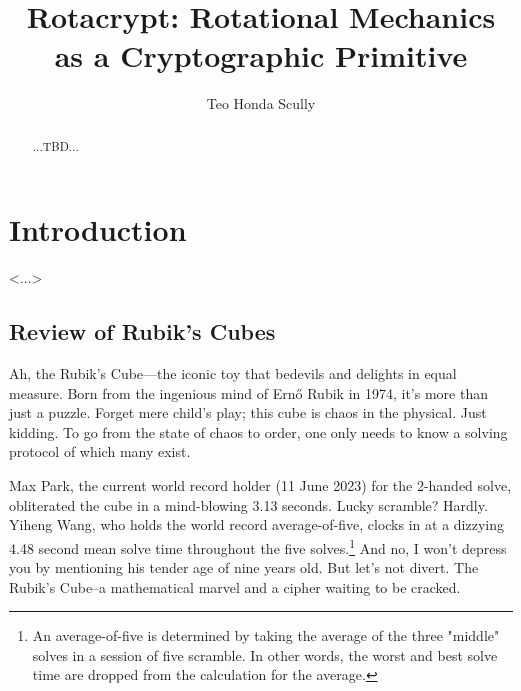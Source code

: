 \documentclass[12pt]{article}
\title{Rotacrypt: Rotational Mechanics as a Cryptographic Primitive}
\author{Teo Honda Scully}
\date{}
\begin{document}
\maketitle

\begin{abstract}
...TBD...
\end{abstract}

\tableofcontents

\newpage

\section{Introduction}
<...>

\subsection{Review of Rubik's Cubes}
Ah, the Rubik's Cube—the iconic toy that bedevils and delights in equal measure. Born from the ingenious mind of Ernő Rubik in 1974, it's more than just a puzzle. Forget mere child's play; this cube is chaos in the physical. Just kidding. To go from the state of chaos to order, one only needs to know a solving protocol of which many exist.

Max Park, the current world record holder (11 June 2023) for the 2-handed solve, obliterated the cube in a mind-blowing 3.13 seconds. Lucky scramble? Hardly. Yiheng Wang, who holds the world record average-of-five, clocks in at a dizzying 4.48 second mean solve time throughout the five solves.\footnote{An average-of-five is determined by taking the average of the three "middle" solves in a session of five scramble. In other words, the worst and best solve time are dropped from the calculation for the average.} And no, I won't depress you by mentioning his tender age of nine years old. But let's not divert. The Rubik's Cube--a mathematical marvel and a cipher waiting to be cracked. \\
\end{document}
